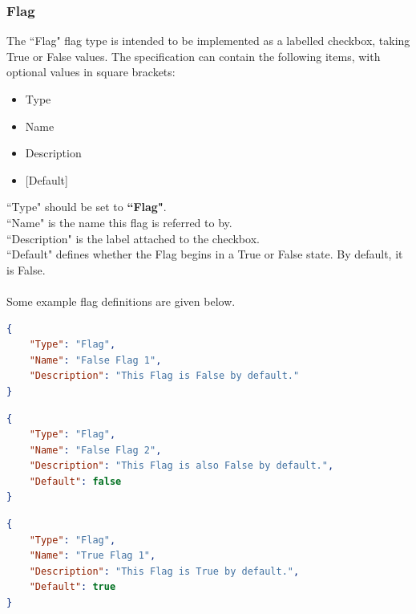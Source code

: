 \documentclass{article}
\begin{document}
\subsubsection{Flag}
The ``Flag" flag type is intended to be implemented as a labelled checkbox, taking True or False values. The specification can contain the following items, with optional values in square brackets:
\begin{itemize}
\item Type
\item Name
\item Description
\item {[Default]}
\end{itemize}
``Type" should be set to \textbf{``Flag"}.\\
``Name" is the name this flag is referred to by.\\
``Description" is the label attached to the checkbox.\\
``Default" defines whether the Flag begins in a True or False state. By default, it is False.\\\\
Some example flag definitions are given below.
\begin{lstlisting}[language=json,firstnumber=1]
{
    "Type": "Flag",
    "Name": "False Flag 1",
    "Description": "This Flag is False by default."
}
\end{lstlisting}
\begin{lstlisting}[language=json,firstnumber=1]
{
    "Type": "Flag",
    "Name": "False Flag 2",
    "Description": "This Flag is also False by default.",
    "Default": false
}
\end{lstlisting}

\begin{lstlisting}[language=json,firstnumber=1]
{
    "Type": "Flag",
    "Name": "True Flag 1",
    "Description": "This Flag is True by default.",
    "Default": true
}
\end{lstlisting}
\end{document}
